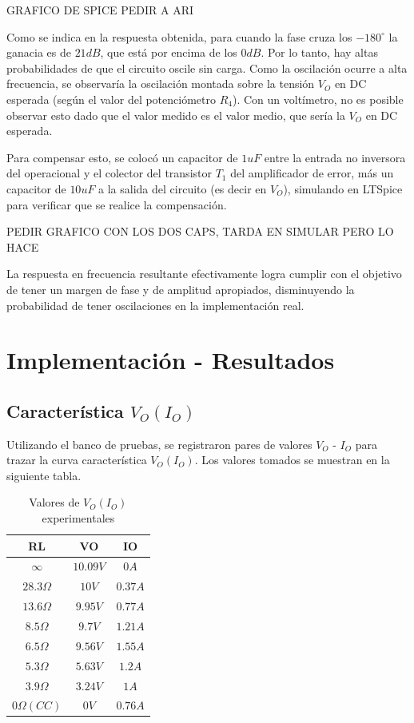 GRAFICO DE SPICE PEDIR A ARI

Como se indica en la respuesta obtenida, para cuando la fase cruza los $-180^{\circ}$ la ganacia es de $21dB$, que est\'a por encima de los $0dB$. Por lo tanto, hay altas probabilidades de que el circuito oscile sin carga. Como la oscilaci\'on ocurre a alta frecuencia, se observar\'ia la oscilaci\'on montada sobre la tensi\'on $V_O$ en DC esperada (seg\'un el valor del potenci\'ometro $R_4$). Con un volt\'imetro, no es posible observar esto dado que el valor medido es el valor medio, que ser\'ia la $V_O$ en DC esperada.

Para compensar esto, se coloc\'o un capacitor de $1uF$ entre la entrada no inversora del operacional y el colector del transistor $T_1$ del amplificador de error, m\'as un capacitor de $10uF$ a la salida del circuito (es decir en $V_O$), simulando en LTSpice para verificar que se realice la compensaci\'on.

PEDIR GRAFICO CON LOS DOS CAPS, TARDA EN SIMULAR PERO LO HACE

La respuesta en frecuencia resultante efectivamente logra cumplir con el objetivo de tener un margen de fase y de amplitud apropiados, disminuyendo la probabilidad de tener oscilaciones en la implementaci\'on real.

\newpage

\section{Implementaci\'on - Resultados}

\subsection{Caracter\'istica $V_O(I_O)$}

Utilizando el banco de pruebas, se registraron pares de valores $V_O$ - $I_O$ para trazar la curva caracter\'istica $V_O(I_O)$. Los valores tomados se muestran en la siguiente tabla.

\begin{table}[!h]
\begin{centering}

\begin{tabular}[H]{|c|c|c|}
\hline 
RL & VO & IO\tabularnewline
\hline 
\hline 
$\infty$ & $10.09V$ & $0A$\tabularnewline
\hline 
$28.3 \Omega$ & $10V$ & $0.37A$\tabularnewline
\hline 
$13.6 \Omega$ & $9.95V$ & $0.77A$\tabularnewline
\hline 
$8.5 \Omega$ & $9.7V$ & $1.21A$\tabularnewline
\hline 
$6.5 \Omega$ & $9.56V$ & $1.55A$\tabularnewline
\hline 
$5.3 \Omega$ & $5.63V$ & $1.2A$\tabularnewline
\hline 
$3.9 \Omega$ & $3.24V$ & $1A$\tabularnewline
\hline 
$0 \Omega (CC)$ & $0V$ & $0.76A$\tabularnewline
\hline 
\end{tabular}
\par\end{centering}
\caption{Valores de $V_O(I_O)$ experimentales}

\end{table}

